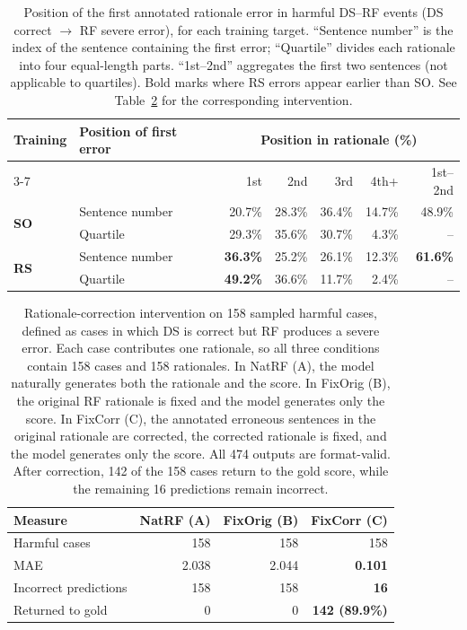 \begin{table}[t]
\centering
\normalsize
\begin{tabular}{llrrrrr}
\toprule
Training & Position of first error & \multicolumn{5}{c}{Position in rationale (\%)} \\
\cmidrule(lr){3-7}
 & & 1st & 2nd & 3rd & 4th+ & 1st--2nd \\
\midrule
\multirow{2}{*}{\textbf{SO}}
 & Sentence number & 20.7\% & 28.3\% & 36.4\% & 14.7\% & 48.9\% \\
 & Quartile         & 29.3\% & 35.6\% & 30.7\% & 4.3\%  & -- \\
\midrule
\multirow{2}{*}{\textbf{RS}}
 & Sentence number & \textbf{36.3\%} & 25.2\% & 26.1\% & 12.3\% & \textbf{61.6\%} \\
 & Quartile         & \textbf{49.2\%} & 36.6\% & 11.7\% & 2.4\%  & -- \\
\bottomrule
\end{tabular}
\caption{Position of the first annotated rationale error in harmful DS--RF events (DS correct $\to$ RF severe error), for each training target. ``Sentence number'' is the index of the sentence containing the first error; ``Quartile'' divides each rationale into four equal-length parts. ``1st--2nd'' aggregates the first two sentences (not applicable to quartiles). Bold marks where RS errors appear earlier than SO. See Table~\ref{tab:full-correction-aggregate} for the corresponding intervention.}
\label{tab:full-first-error-position}
\end{table}

\begin{table}[t]
\centering
\normalsize
\begin{tabular}{lrrr}
\toprule
Measure & NatRF (A) & FixOrig (B) & FixCorr (C) \\
\midrule
Harmful cases & 158 & 158 & 158 \\
\midrule
MAE & 2.038 & 2.044 & \textbf{0.101} \\
Incorrect predictions & 158 & 158 & \textbf{16} \\
Returned to gold & 0 & 0 & \textbf{142 (89.9\%)} \\
\bottomrule
\end{tabular}
\caption{Rationale-correction intervention on 158 sampled harmful cases,
defined as cases in which DS is correct but RF produces a severe error.
Each case contributes one rationale, so all three conditions contain
158 cases and 158 rationales. In NatRF (A), the model naturally generates
both the rationale and the score. In FixOrig (B), the original RF rationale
is fixed and the model generates only the score. In FixCorr (C), the
annotated erroneous sentences in the original rationale are corrected,
the corrected rationale is fixed, and the model generates only the score.
All 474 outputs are format-valid. After correction, 142 of the 158 cases
return to the gold score, while the remaining 16 predictions remain
incorrect.}
\label{tab:full-correction-aggregate}
\end{table}

